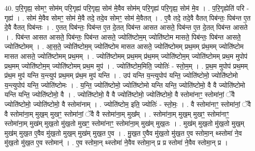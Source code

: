 \documentclass[17pt]{extarticle}
\begin{document}
40. प॒रि॒गृह्य॒ सोमꣳ॒॒ सोम॑म् परि॒गृह्य॑ परि॒गृह्य॒ सोम॑ मे॒वैव सोम॑म् परि॒गृह्य॑ परि॒गृह्य॒ सोम॑ मे॒व । . प॒रि॒गृह्येति॑ परि - गृह्य॑ । . सोम॑ मे॒वैव सोमꣳ॒॒ सोम॑ मे॒वै तदे॒ तदे॒व सोमꣳ॒॒ सोम॑ मे॒वैतत् । . ए॒वै तदे॒ तदे॒वै वैतत् पिब॑न्तः॒ पिब॑न्त ए॒त दे॒वै वैतत् पिब॑न्तः । . ए॒तत् पिब॑न्तः॒ पिब॑न्त ए॒त दे॒तत् पिब॑न्त आसत आसते॒ पिब॑न्त ए॒त दे॒तत् पिब॑न्त आसते । . पिब॑न्त आसत आसते॒ पिब॑न्तः॒ पिब॑न्त आसते॒ ज्योति॑ष्टोम॒म् ज्योति॑ष्टोम मासते॒ पिब॑न्तः॒ पिब॑न्त आसते॒ ज्योति॑ष्टोमम् । . आ॒स॒ते॒ ज्योति॑ष्टोम॒म् ज्योति॑ष्टोम मासत आसते॒ ज्योति॑ष्टोमम् प्रथ॒मम् प्र॑थ॒मम् ज्योति॑ष्टोम मासत आसते॒ ज्योति॑ष्टोमम् प्रथ॒मम् । . ज्योति॑ष्टोमम् प्रथ॒मम् प्र॑थ॒मम् ज्योति॑ष्टोम॒म् ज्योति॑ष्टोमम् प्रथ॒म मुपोप॑ प्रथ॒मम् ज्योति॑ष्टोम॒म् ज्योति॑ष्टोमम् प्रथ॒म मुप॑ । . ज्योति॑ष्टोम॒मिति॒ ज्योतिः॑ - स्तो॒म॒म् । . प्र॒थ॒म मुपोप॑ प्रथ॒मम् प्र॑थ॒म मुप॑ यन्ति य॒न्त्युप॑ प्रथ॒मम् प्र॑थ॒म मुप॑ यन्ति । . उप॑ यन्ति य॒न्त्युपोप॑ यन्ति॒ ज्योति॑ष्टोमो॒ ज्योति॑ष्टोमो य॒न्त्युपोप॑ यन्ति॒ ज्योति॑ष्टोमः । . य॒न्ति॒ ज्योति॑ष्टोमो॒ ज्योति॑ष्टोमो यन्ति यन्ति॒ ज्योति॑ष्टोमो॒ वै वै ज्योति॑ष्टोमो यन्ति यन्ति॒ ज्योति॑ष्टोमो॒ वै । . ज्योति॑ष्टोमो॒ वै वै ज्योति॑ष्टोमो॒ ज्योति॑ष्टोमो॒ वै स्तोमा॑नाꣳ॒॒ स्तोमा॑नां॒ ॅवै ज्योति॑ष्टोमो॒ ज्योति॑ष्टोमो॒ वै स्तोमा॑नाम् । . ज्योति॑ष्टोम॒ इति॒ ज्योतिः॑ - स्तो॒मः॒ । . वै स्तोमा॑नाꣳ॒॒ स्तोमा॑नां॒ ॅवै वै स्तोमा॑ना॒म् मुख॒म् मुखꣳ॒॒ स्तोमा॑नां॒ ॅवै वै स्तोमा॑ना॒म् मुख᳚म् । . स्तोमा॑ना॒म् मुख॒म् मुखꣳ॒॒ स्तोमा॑नाꣳ॒॒ स्तोमा॑ना॒म् मुख॑म् मुख॒तो मु॑ख॒तो मुखꣳ॒॒ स्तोमा॑नाꣳ॒॒ स्तोमा॑ना॒म् मुख॑म् मुख॒तः । . मुख॑म् मुख॒तो मु॑ख॒तो मुख॒म् मुख॑म् मुख॒त ए॒वैव मु॑ख॒तो मुख॒म् मुख॑म् मुख॒त ए॒व । . मु॒ख॒त ए॒वैव मु॑ख॒तो मु॑ख॒त ए॒व स्तोमा॒न् थ्स्तोमा॑ ने॒व मु॑ख॒तो मु॑ख॒त ए॒व स्तोमान्॑ । . ए॒व स्तोमा॒न् थ्स्तोमा॑ ने॒वैव स्तोमा॒न् प्र प्र स्तोमा॑ ने॒वैव स्तोमा॒न् प्र । \newline
\end{document}
